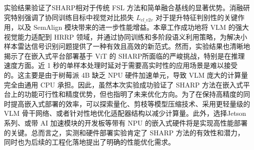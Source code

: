 实验结果验证了SHARP相对于传统 FSL 方法和简单融合基线的显著优势。消融研究特别强调了协同训练目标中视觉对比损失 $L_{cl\_v2v}$ 对于提升特征判别性的关键作用，以及 SemAlign 模块带来的进一步性能增益。本章工作成功地将 VLM 的强大视觉能力适配到 HRRP 领域，并通过协同训练和多阶段语义利用策略，为解决小样本雷达信号识别问题提供了一种有效且高效的新范式。然而，实验结果也清晰地揭示了在嵌入式平台部署基于 ViT 的 SHARP所面临的严峻挑战，特别是在推理速度方面。近 1 秒的单样本处理时延对于需要高实时性的应用场景是难以接受的。这主要是由于树莓派 4B 缺乏 NPU 硬件加速单元，导致 VLM 庞大的计算量完全由通用 CPU 承担。因此，虽然本次实验成功验证了 SHARP 方法在嵌入式平台上的功能可行性和精度优势，但也指明了未来优化方向。为了在保持高精度的同时提高嵌入式部署的效率，可以探索量化、剪枝等模型压缩技术、采用更轻量级的 VLM 骨干网络、或者针对性地优化适配器结构以减少计算量。此外，选择Jetson 系列、或带 AI 加速模块的开发板等带有 NPU 的嵌入式硬件将是实现高性能部署的关键。总而言之，实测和硬件部署实验肯定了 SHARP 方法的有效性和潜力，同时也为后续的工程化落地提出了明确的性能优化需求。